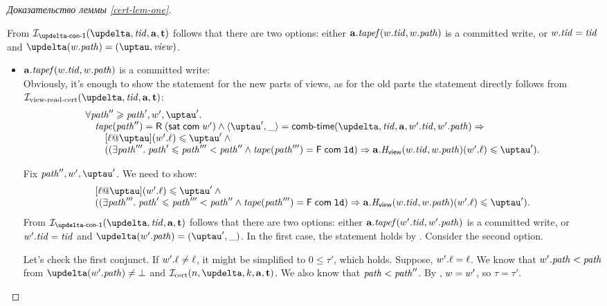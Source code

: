 \begin{proof}[Доказательство леммы \ref{cert-lem-one}]
\begin{itemize}
      From $\invDeltaDefOne(\delta, \tId, \aT, \tT)$ follows that there are two options:
      either $\mathbf{a}.\mathit{tapef}(w.\mathit{tid}, w.\mathit{path})$ is a committed write, or $w.\mathit{tid} = \mathit{tid}$ and $\delta(\w.\cpath) = (\tau, \R)$.
      \begin{itemize}
        \item $\mathbf{a}.\mathit{tapef}(w.\mathit{tid}, w.\mathit{path})$ is a committed write: \\
      Obviously, it's enough to show the statement for the new parts of views, as for the old parts the statement directly
      follows from $\invViewReadCERT(\delta, \tId, \aT, \tT)$:
      \[\begin{array}{l}
  \forall \cpath'' \ge \cpath', \w', \tau'. \\
\quad \tape(\cpath'') = \tapeRead{(\tapeSatisfied{\Committed}{\w'})} \land
   \angled{\tau', \_} = \deltaHmap(\delta, \tId, \aT, \w'.\tId, \w'.\cpath) \Rightarrow \\
\quad \quad [\loc @ \tau](\w'.\loc) \le \tau' \land {} \\
\quad \quad ((\exists \cpath'''. \; \cpath' \le \cpath''' < \cpath'' \land 
             \tape(\cpath''') = \tapeFence{\Committed}{\LD}) \Rightarrow \aT.\rmap(\w.\tId, \w.\cpath)(\w'.\loc) \le \tau'). \\
      \end{array}\]

      Fix $\cpath'', \w', \tau'$. We need to show:
      \[\begin{array}{l}
        [\loc @ \tau](\w'.\loc) \le \tau' \land {} \\
        ((\exists \cpath'''. \; \cpath' \le \cpath''' < \cpath'' \land 
             \tape(\cpath''') = \tapeFence{\Committed}{\LD}) \Rightarrow \aT.\rmap(\w.\tId, \w.\cpath)(\w'.\loc) \le \tau'). \\
      \end{array}\]
      From $\invDeltaDefOne(\delta, \tId, \aT, \tT)$ follows that there are two options:
      either $\mathbf{a}.\mathit{tapef}(w'.\mathit{tid}, w'.\mathit{path})$ is a committed write, or $w'.\mathit{tid} = \mathit{tid}$ and $\delta(\w'.\cpath) = (\tau', \_)$.
      In the first case, the statement holds by \app{\ref{thm:invAview}}. Consider the second option.
      
      Let's check the first conjunct. If $w'.\ell \not = \ell$, it might be simplified to $0 \le \tau'$, which holds.
      Suppose, $w'.\ell = \ell$.
      We know that $w'.\mathit{path} < \mathit{path}$ from $\delta(\w'.\cpath) \not = \bot$ and $\invCert(n, \delta, k, \aT, \tT)$.
      We also know that $\mathit{path} < \mathit{path}''$. By \app{\ref{inv:invAReadRead}}, $w = w'$, so $\tau = \tau'$.
      

\end{itemize}
\end{itemize}
\end{proof}
